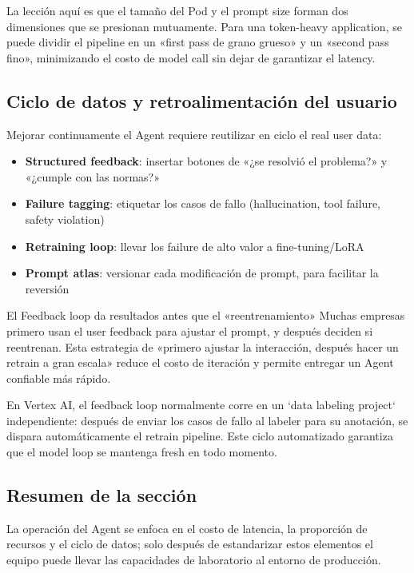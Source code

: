 \documentclass[a4paper]{article}
\begin{document}
La lección aquí es que el tamaño del Pod y el prompt size forman dos dimensiones que se presionan mutuamente. Para una token-heavy application, se puede dividir el pipeline en un «first pass de grano grueso» y un «second pass fino», minimizando el costo de model call sin dejar de garantizar el latency.

\subsection{Ciclo de datos y retroalimentación del usuario}

Mejorar continuamente el Agent requiere reutilizar en ciclo el real user data:

\begin{itemize}
    \item \textbf{Structured feedback}: insertar botones de «¿se resolvió el problema?» y «¿cumple con las normas?»
    \item \textbf{Failure tagging}: etiquetar los casos de fallo (hallucination, tool failure, safety violation)
    \item \textbf{Retraining loop}: llevar los failure de alto valor a fine-tuning/LoRA
    \item \textbf{Prompt atlas}: versionar cada modificación de prompt, para facilitar la reversión
\end{itemize}

\begin{knowledgebox}{El Feedback loop da resultados antes que el «reentrenamiento»}
Muchas empresas primero usan el user feedback para ajustar el prompt, y después deciden si reentrenan. Esta estrategia de «primero ajustar la interacción, después hacer un retrain a gran escala» reduce el costo de iteración y permite entregar un Agent confiable más rápido.
\end{knowledgebox}

En Vertex AI, el feedback loop normalmente corre en un `data labeling project` independiente: después de enviar los casos de fallo al labeler para su anotación, se dispara automáticamente el retrain pipeline. Este ciclo automatizado garantiza que el model loop se mantenga fresh en todo momento.

\subsection{Resumen de la sección}

La operación del Agent se enfoca en el costo de latencia, la proporción de recursos y el ciclo de datos; solo después de estandarizar estos elementos el equipo puede llevar las capacidades de laboratorio al entorno de producción.
\end{document}
